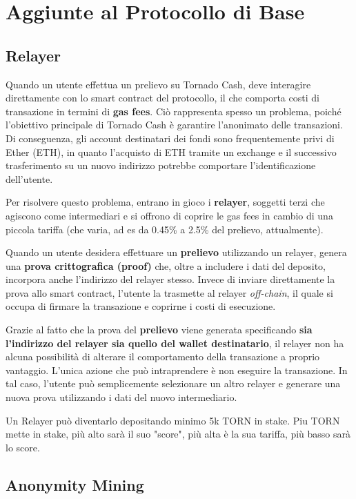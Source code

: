 \chapter{Aggiunte al Protocollo di Base}

\section{Relayer}

Quando un utente effettua un prelievo su Tornado Cash, deve interagire direttamente con lo smart contract del protocollo, il che comporta costi di transazione in termini di \textbf{gas fees}. Ciò rappresenta spesso un problema, poiché l’obiettivo principale di Tornado Cash è garantire l’anonimato delle transazioni. Di conseguenza, gli account destinatari dei fondi sono frequentemente privi di Ether (ETH), in quanto l’acquisto di ETH tramite un exchange e il successivo trasferimento su un nuovo indirizzo potrebbe comportare l’identificazione dell’utente.

Per risolvere questo problema, entrano in gioco i \textbf{relayer}, soggetti terzi che agiscono come intermediari e si offrono di coprire le gas fees in cambio di una piccola tariffa (che varia, ad es da 0.45\% a 2.5\% del prelievo, attualmente).

Quando un utente desidera effettuare un \textbf{prelievo} utilizzando un relayer, genera una \textbf{prova crittografica (proof)} che, oltre a includere i dati del deposito, incorpora anche l’indirizzo del relayer stesso. Invece di inviare direttamente la prova allo smart contract, l’utente la trasmette al relayer \textit{off-chain}, il quale si occupa di firmare la transazione e coprirne i costi di esecuzione.

Grazie al fatto che la prova del \textbf{prelievo} viene generata specificando \textbf{sia l’indirizzo del relayer sia quello del wallet destinatario}, il relayer non ha alcuna possibilità di alterare il comportamento della transazione a proprio vantaggio. L’unica azione che può intraprendere è non eseguire la transazione. In tal caso, l’utente può semplicemente selezionare un altro relayer e generare una nuova prova utilizzando i dati del nuovo intermediario.

Un Relayer può diventarlo depositando minimo 5k TORN in stake. Piu TORN mette in stake, più alto sarà il suo "score", più alta è la sua tariffa, più basso sarà lo score.

\section{Anonymity Mining}

